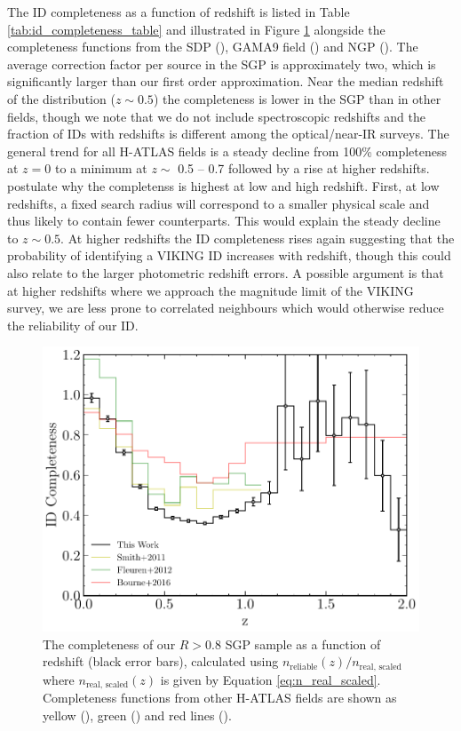 The ID completeness as a function of redshift is listed in Table \ref{tab:id_completeness_table} and illustrated in Figure \ref{fig:id_completeness} alongside the completeness functions from the SDP (\citealt{Smith_2011}), GAMA9 field (\citealt{Fleuren_2012}) and NGP (\citealt{Bourne_2016}). The average correction factor per source in the SGP is approximately two, which is significantly larger than our first order approximation. Near the median redshift of the distribution ($z \sim 0.5$) the completeness is lower in the SGP than in other fields, though we note that we do not include spectroscopic redshifts and the fraction of IDs with redshifts is different among the optical/near-IR surveys. The general trend for all H-ATLAS fields is a steady decline from 100\% completeness at $z = 0$ to a minimum at $z \sim$ 0.5 -- 0.7 followed by a rise at higher redshifts. \citealt{Bourne_2016} postulate why the completenss is highest at low and high redshift. First, at low redshifts, a fixed search radius will correspond to a smaller physical scale and thus likely to contain fewer counterparts. This would explain the steady decline to $z \sim 0.5$. At higher redshifts the ID completeness rises again suggesting that the probability of identifying a VIKING ID increases with redshift, though this could also relate to the larger photometric redshift errors. A possible argument is that at higher redshifts where we approach the magnitude limit of the VIKING survey, we are less prone to correlated neighbours which would otherwise reduce the reliability of our ID.

\begin{figure}
	\centering
	\includegraphics[width=0.75\columnwidth]{Figures/id_completeness.pdf}
	\caption[Completeness of our reliable SGP sample as a function of redshift]{The completeness of our $R > 0.8$ SGP sample as a function of redshift (black error bars), calculated using $n_{\textrm{reliable}}(z)/n_{\textrm{real, scaled}}$ where $n_{\textrm{real, scaled}}(z)$ is given by Equation \ref{eq:n_real_scaled}. Completeness functions from other H-ATLAS fields are shown as yellow (\citealt{Smith_2011}), green (\citealt{Fleuren_2012}) and red lines (\citealt{Bourne_2016}).}
	\label{fig:id_completeness}
\end{figure}

